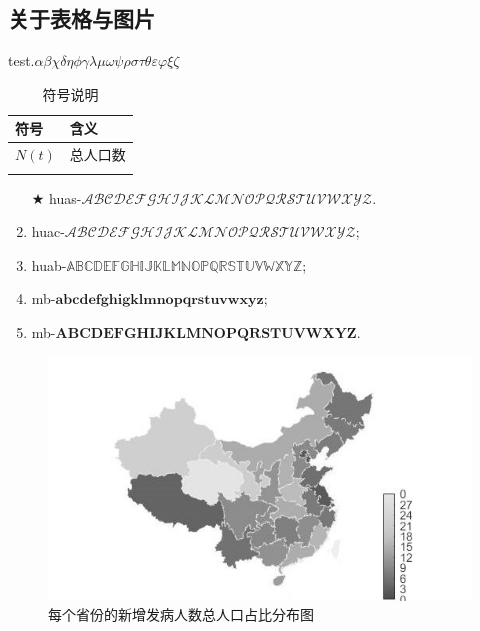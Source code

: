 \documentclass[12pt,twoside,UTF8]{ctexart}
\theoremstyle{nonumberplain}
\newcommand{\wuhao}{\fontsize{10.5pt}{\baselineskip}\selectfont}
\begin{document}
\subsection{关于表格与图片}
test.$\alpha \beta \chi \delta \eta \phi \gamma \lambda  \mu \omega \psi \rho \sigma \tau \theta \varepsilon \varphi  \xi \zeta $
\begin{table}[H]%
  \wuhao 
  \label{t1} 
  \tabcolsep 5mm 
  \caption{\heiti 符号说明}
  \centering
    \begin{tabular}{ll}
    \Xhline{0.8pt}
    符号   & 含义 \\
    \hline
    $N(t)$ & 总人口数 \\
    \Xhline{0.8pt}
    \end{tabular} 
\end{table}

\begin{enumerate}[(1),nosep,itemindent=0em,labelsep=1em,itemsep=1em]%
	\item[$\bigstar$] huas-$\mathscr{ABCDEFGHIJKLMNOPQRSTUVWXYZ}$.
	\item  huac-$\mathcal{ABCDEFGHIJKLMNOPQRSTUVWXYZ}$; 	
	\item huab-$\mathbb{ABCDEFGHIJKLMNOPQRSTUVWXYZ}$;	
	\item mb-$\mathbf{abcdefghigklmnopqrstuvwxyz}$;
	\item mb-$\mathbf{ABCDEFGHIJKLMNOPQRSTUVWXYZ}$.
\end{enumerate}

\begin{figure}[H]%
        \centering
        \includegraphics[width=0.8\linewidth]{dt.jpg}
        \caption{\heiti  每个省份的新增发病人数总人口占比分布图}
        \label{f1}
\end{figure}
\end{document}
